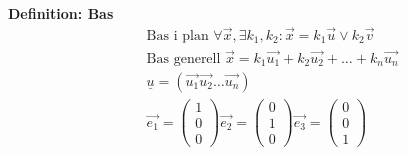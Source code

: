 \textbf{Definition: Bas}
\begin{align*}
  &\quad  \text{Bas i plan } \forall{\vec{x}},\exists{k_1,k_2}:
  \vec{x} = k_1\vec{u} \lor k_2\vec{v} \\
  &\quad  \text{Bas generell } \vec{x} = k_1\vec{u_1}+k_2\vec{u_2}+ \ldots +k_n\vec{u_n} \\
  &\quad \underline{u}=(\vec{u_1}\vec{u_2}\ldots\vec{u_n}) \\
  &\quad
  \vec{e_1}=\begin{pmatrix}  1 \\  0 \\  0  \end{pmatrix}
  \vec{e_2}=\begin{pmatrix}  0 \\  1 \\  0  \end{pmatrix}
  \vec{e_3}=\begin{pmatrix}  0 \\  0 \\  1  \end{pmatrix} \\
\end{align*}

